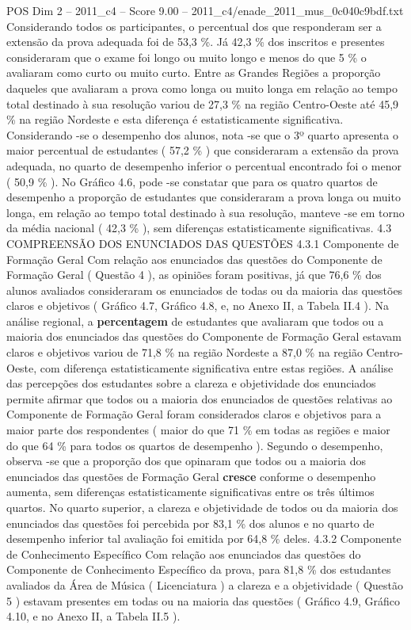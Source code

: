 \begin{textsample}{POS Dim 2 – 2011\_c4 – Score 9.00 – 2011\_c4/enade\_2011\_mus\_0c040c9bdf.txt}
Considerando todos os participantes, o percentual dos que responderam ser a extensão da prova adequada foi de 53,3 \%.
Já 42,3 \% dos inscritos e presentes consideraram que o exame foi longo ou muito longo e menos do que 5 \% o avaliaram como curto ou muito curto.
Entre as Grandes Regiões a proporção daqueles que avaliaram a prova como longa ou muito longa em relação ao tempo total destinado à sua resolução variou de 27,3 \% na região Centro-Oeste até 45,9 \% na região Nordeste e esta diferença é estatisticamente significativa.
Considerando -se o desempenho dos alunos, nota -se que o 3º quarto apresenta o maior percentual de estudantes ( 57,2 \% ) que consideraram a extensão da prova adequada, no quarto de desempenho inferior o percentual encontrado foi o menor ( 50,9 \% ).
No Gráfico 4.6, pode -se constatar que para os quatro quartos de desempenho a proporção de estudantes que consideraram a prova longa ou muito longa, em relação ao tempo total destinado à sua resolução, manteve -se em torno da média nacional ( 42,3 \% ), sem diferenças estatisticamente significativas. 4.3 COMPREENSÃO DOS ENUNCIADOS DAS QUESTÕES 4.3.1 Componente de Formação Geral Com relação aos enunciados das questões do Componente de Formação Geral ( Questão 4 ), as opiniões foram positivas, já que 76,6 \% dos alunos avaliados consideraram os enunciados de todas ou da maioria das questões claros e objetivos ( Gráfico 4.7, Gráfico 4.8, e, no Anexo II, a Tabela II.4 ).
Na análise regional, a \textbf{percentagem} de estudantes que avaliaram que todos ou a maioria dos enunciados das questões do Componente de Formação Geral estavam claros e objetivos variou de 71,8 \% na região Nordeste a 87,0 \% na região Centro-Oeste, com diferença estatisticamente significativa entre estas regiões.
A análise das percepções dos estudantes sobre a clareza e objetividade dos enunciados permite afirmar que todos ou a maioria dos enunciados de questões relativas ao Componente de Formação Geral foram considerados claros e objetivos para a maior parte dos respondentes ( maior do que 71 \% em todas as regiões e maior do que 64 \% para todos os quartos de desempenho ).
Segundo o desempenho, observa -se que a proporção dos que opinaram que todos ou a maioria dos enunciados das questões de Formação Geral \textbf{cresce} conforme o desempenho aumenta, sem diferenças estatisticamente significativas entre os três últimos quartos.
No quarto superior, a clareza e objetividade de todos ou da maioria dos enunciados das questões foi percebida por 83,1 \% dos alunos e no quarto de desempenho inferior tal avaliação foi emitida por 64,8 \% deles. 4.3.2 Componente de Conhecimento Específico Com relação aos enunciados das questões do Componente de Conhecimento Específico da prova, para 81,8 \% dos estudantes avaliados da Área de Música ( Licenciatura ) a clareza e a objetividade ( Questão 5 ) estavam presentes em todas ou na maioria das questões ( Gráfico 4.9, Gráfico 4.10, e no Anexo II, a Tabela II.5 ).

\end{textsample}
